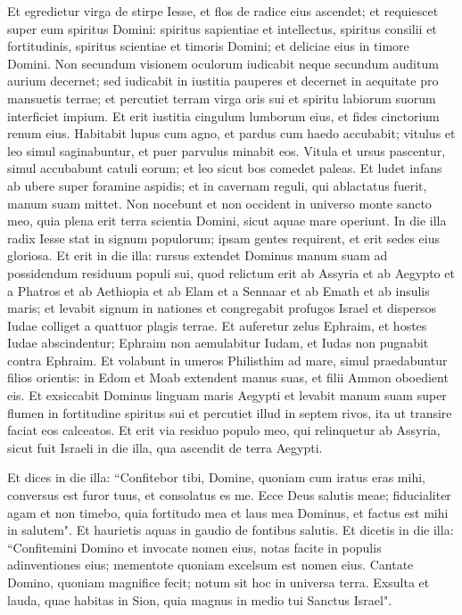 \begin{biblechapter}  
\verse Et egredietur virga de stirpe Iesse, et flos de radice eius ascendet; 
\verse et requiescet super eum spiritus Domini: spiritus sapientiae et intellectus, spiritus consilii et fortitudinis, spiritus scientiae et timoris Domini; 
\verse et deliciae eius in timore Domini. Non secundum visionem oculorum iudicabit neque secundum auditum aurium decernet; 
\verse sed iudicabit in iustitia pauperes et decernet in aequitate pro mansuetis terrae; et percutiet terram virga oris sui et spiritu labiorum suorum interficiet impium. 
\verse Et erit iustitia cingulum lumborum eius, et fides cinctorium renum eius. 
\verse Habitabit lupus cum agno, et pardus cum haedo accubabit; vitulus et leo simul saginabuntur, et puer parvulus minabit eos. 
\verse Vitula et ursus pascentur, simul accubabunt catuli eorum; et leo sicut bos comedet paleas. 
\verse Et ludet infans ab ubere super foramine aspidis; et in cavernam reguli, qui ablactatus fuerit, manum suam mittet. 
\verse Non nocebunt et non occident in universo monte sancto meo, quia plena erit terra scientia Domini, sicut aquae mare operiunt. 
\verse In die illa radix Iesse stat in signum populorum; ipsam gentes requirent, et erit sedes eius gloriosa. 
\verse Et erit in die illa: rursus extendet Dominus manum suam ad possidendum residuum populi sui, quod relictum erit ab Assyria et ab Aegypto et a Phatros et ab Aethiopia et ab Elam et a Sennaar et ab Emath et ab insulis maris; 
\verse et levabit signum in nationes et congregabit profugos Israel et dispersos Iudae colliget a quattuor plagis terrae. 
\verse Et auferetur zelus Ephraim, et hostes Iudae abscindentur; Ephraim non aemulabitur Iudam, et Iudas non pugnabit contra Ephraim. 
\verse Et volabunt in umeros Philisthim ad mare, simul praedabuntur filios orientis: in Edom et Moab extendent manus suas, et filii Ammon oboedient eis. 
\verse Et exsiccabit Dominus linguam maris Aegypti et levabit manum suam super flumen in fortitudine spiritus sui et percutiet illud in septem rivos, ita ut transire faciat eos calceatos. 
\verse Et erit via residuo populo meo, qui relinquetur ab Assyria, sicut fuit Israeli in die illa, qua ascendit de terra Aegypti. 
\end{biblechapter}

\begin{biblechapter}  
\verse Et dices in die illa: “Confitebor tibi, Domine, quoniam cum iratus eras mihi, conversus est furor tuus, et consolatus es me. 
\verse Ecce Deus salutis meae; fiducialiter agam et non timebo, quia fortitudo mea et laus mea Dominus, et factus est mihi in salutem". 
\verse Et haurietis aquas in gaudio de fontibus salutis. 
\verse Et dicetis in die illa: “Confitemini Domino et invocate nomen eius, notas facite in populis adinventiones eius; mementote quoniam excelsum est nomen eius. 
\verse Cantate Domino, quoniam magnifice fecit; notum sit hoc in universa terra. 
\verse Exsulta et lauda, quae habitas in Sion, quia magnus in medio tui Sanctus Israel". 
\end{biblechapter}

